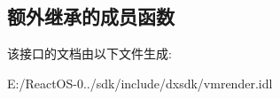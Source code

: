 \subsection*{额外继承的成员函数}


该接口的文档由以下文件生成\+:\begin{DoxyCompactItemize}
\item 
E\+:/\+React\+O\+S-\/0../sdk/include/dxsdk/vmrender.\+idl\end{DoxyCompactItemize}
